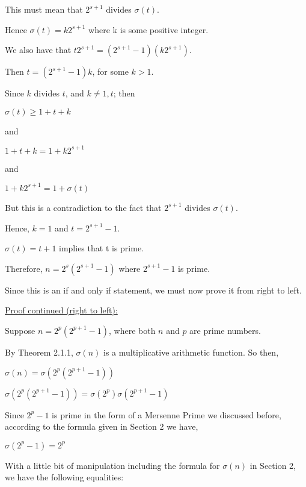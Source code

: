 \documentclass[12pt]{amsart}
\begin{document}
This must mean that $2^{s+1}$ divides $\sigma(t)$. 

Hence $\sigma(t)=k 2^{s+1}$ where k is some positive integer. 

We also have that $t2^{s+1}=(2^{s+1}-1)(k 2^{s+1})$. 

Then $t=(2^{s+1}-1)k$, for some $k > 1$. 

Since $k$ divides $t$, and $k \neq 1, t$; then

\begin{center}

$\sigma(t) \geq 1+t+k$

and

$1+t+k = 1 + k2^{s+1}$

and

$1 + k2^{s+1} = 1 + \sigma(t)$

\bigskip

But this is a contradiction to the fact that $2^{s+1}$ divides $\sigma(t)$.
\end{center}

Hence, $k = 1$ and $t=2^{s+1}-1$. 

$\sigma(t)= t+1$ implies that t is prime. 

Therefore, $n=2^s(2^{s+1}-1)$ where $2^{s+1}-1$ is prime.

\medskip

Since this is an if and only if statement, we must now prove it from right to left.

\medskip

\underline{Proof continued (right to left):} 

Suppose $n=2^p(2^{p+1}-1)$, where both $n$ and $p$ are prime numbers. 

By Theorem 2.1.1, $\sigma(n)$ is a multiplicative arithmetic function. So then,

\begin{center}
$\sigma{(n)} = \sigma{(2^p(2^{p+1}-1))}$

$\sigma{(2^p(2^{p+1}-1))} = \sigma{(2^p)}\sigma{(2^{p+1}-1)}$
\end{center}

Since $2^p - 1$ is prime in the form of a Mersenne Prime we discussed before, according to the formula given in Section 2 we have,

\begin{center}
$\sigma(2^p - 1) = 2^p$
\end{center}

With a little bit of manipulation including the formula for $\sigma(n)$ in Section 2, we have the following equalities:
\end{document}
